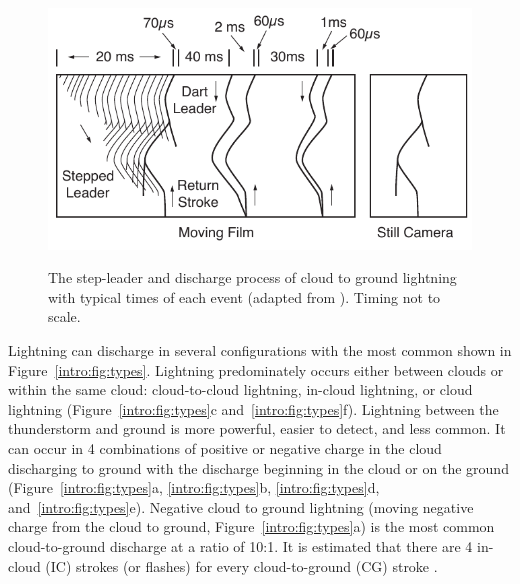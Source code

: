 \begin{figure}[ht!]
	\centering
	\includegraphics[scale=1]{Introduction/Figures/Lightning_Evolution.pdf}\\
	\caption{The step-leader and discharge process of cloud to ground lightning with typical times of each event (adapted from \citet{Uman1969}). Timing not to scale.}
	\label{intro:fig:evolution}
\end{figure}

Lightning can discharge in several configurations with the most common shown in Figure~\ref{intro:fig:types}.
Lightning predominately occurs either between clouds or within the same cloud: cloud-to-cloud lightning, in-cloud lightning, or cloud lightning (Figure~\ref{intro:fig:types}c and~\ref{intro:fig:types}f).
Lightning between the thunderstorm and ground is more powerful, easier to detect, and less common.
It can occur in 4 combinations of positive or negative charge in the cloud discharging to ground with the discharge beginning in the cloud or on the ground (Figure~\ref{intro:fig:types}a, \ref{intro:fig:types}b, \ref{intro:fig:types}d, and~\ref{intro:fig:types}e).
Negative cloud to ground lightning (moving negative charge from the cloud to ground, Figure~\ref{intro:fig:types}a) is the most common cloud-to-ground discharge at a ratio of 10:1.
It is estimated that there are 4 in-cloud (IC) strokes (or flashes) for every cloud-to-ground (CG) stroke \citep{Uman1969}.

